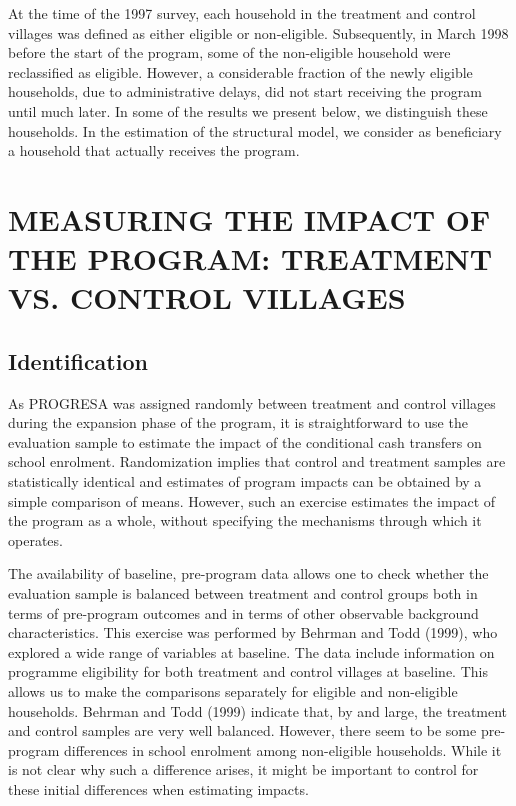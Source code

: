\documentclass{handoutForSolutions}
\begin{document}
At the time of the 1997 survey, each household in the treatment and control villages was defined as either eligible or non-eligible. Subsequently, in March 1998 before the start of the program, some of the non-eligible household were reclassified as eligible. However, a considerable fraction of the newly eligible households, due to administrative delays, did not start receiving the program until much later. In some of the results we present below, we distinguish these households. In the estimation of the structural model, we consider as beneficiary a household that actually receives the program.
\newpage


\section{MEASURING THE IMPACT OF THE PROGRAM: TREATMENT VS. CONTROL VILLAGES}
\subsection{Identification}
As PROGRESA was assigned randomly between treatment and control villages during the expansion phase of the program, it is straightforward to use the evaluation sample to estimate the impact of the conditional cash transfers on school enrolment. Randomization implies that control and treatment samples are statistically identical and estimates of program impacts can be obtained by a simple comparison of means. However, such an exercise estimates the impact of the program as a whole, without specifying the mechanisms through which it operates.

The availability of baseline, pre-program data allows one to check whether the evaluation sample is balanced between treatment and control groups both in terms of pre-program outcomes and in terms of other observable background characteristics. This exercise was performed by Behrman and Todd (1999), who explored a wide range of variables at baseline. The data include information on programme eligibility for both treatment and control villages at baseline. This allows us to make the comparisons separately for eligible and non-eligible households. Behrman and Todd (1999) indicate that, by and large, the treatment and control samples are very well balanced. However, there seem to be some pre-program differences in school enrolment among non-eligible households. While it is not clear why such a difference arises, it might be important to control for these initial differences when estimating impacts.
\end{document}

